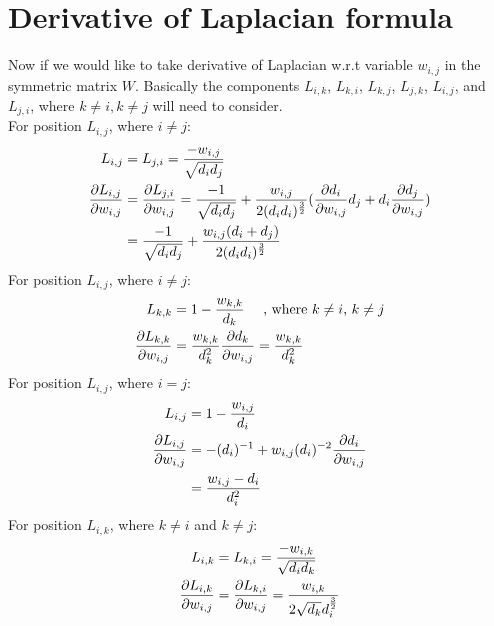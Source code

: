 \documentclass[final]{siamltexmm}
\begin{document}
\section{Derivative of Laplacian formula}
Now if we would like to take derivative of Laplacian w.r.t variable $w_{i,j}$ in the symmetric matrix $W$. Basically the components $L_{i,k}$, $L_{k,i}$, $L_{k,j}$, $L_{j,k}$, $L_{i,j}$, and $L_{j,i}$, where $k \neq i, k \neq j$ will need to consider. \\
For position $L_{i,j}$, where $i \neq j$:
\begin{equation}
\begin{aligned}
L_{i,j} &= L_{j,i} =  {-w_{i,j} \over \sqrt{d_id_j}} \\
{\partial L_{i,j} \over \partial w_{i,j}} &= {\partial L_{j,i} \over \partial w_{i,j}} = {-1 \over \sqrt{d_id_j}} + {w_{i,j} \over 2(d_id_i)^{3\over 2}}({\partial d_i \over \partial w_{i,j}}d_j + d_i{\partial d_j \over \partial w_{i,j}}) \\
&= {-1 \over \sqrt{d_id_j}} + {w_{i,j}(d_i+d_j) \over 2(d_id_i)^{3\over 2}}
\end{aligned}
\end{equation}
For position $L_{i,j}$, where $i \neq j$:
\begin{equation}
\begin{aligned}
L_{k,k} &= 1 - {w_{k,k} \over d_k} \quad \text{ , where $k \neq i$, $k \neq j$} \\
{\partial L_{k,k} \over \partial w_{i,j}} &= {w_{k,k} \over d_k^2}{\partial d_k \over \partial w_{i,j}} = {w_{k,k} \over d_k^2}
\end{aligned}
\end{equation}
For position $L_{i,j}$, where $i = j$:
\begin{equation}
\begin{aligned}
L_{i,j} &=  1 - {w_{i,j} \over d_i} \\
{\partial L_{i,j} \over \partial w_{i,j}} &= -(d_i)^{-1} + w_{i,j}(d_i)^{-2}{\partial d_i\over \partial w_{i,j}} \\
&= {w_{i,j}-d_i \over d_i^2}
\end{aligned}
\end{equation}
For position $L_{i,k}$, where $k \neq i$ and $k \neq j$:
\begin{equation}
\begin{aligned}
L_{i,k} &= L_{k,i} =  {-w_{i,k} \over \sqrt{d_id_k}} \\
{\partial L_{i,k} \over \partial w_{i,j}} &= {\partial L_{k,i} \over \partial w_{i,j}} = {w_{i,k} \over 2\sqrt{d_k}d_i^{3\over2}}
\end{aligned}
\end{equation}
\end{document}
